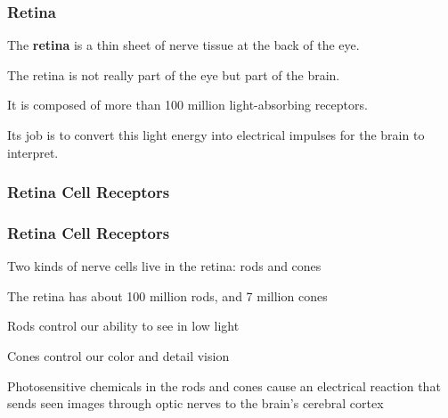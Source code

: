 \documentclass[12pt]{beamer}\usepackage[]{graphicx}\usepackage[]{color}
\begin{document}

\begin{frame}
\begin{center}
\end{center}
\end{frame}


\begin{frame}
\frametitle{Retina}

\bbi
  \item The \textbf{retina} is a thin sheet of nerve tissue at the back of the 
  eye.
  \item The retina is not really part of the eye but part of the brain.
  \item It is composed of more than 100 million light-absorbing receptors.
  \item Its job is to convert this light energy into electrical impulses
  for the brain to interpret.
\ei

\end{frame}


\begin{frame}
\frametitle{Retina Cell Receptors}
\begin{center}
\end{center}
\end{frame}


\begin{frame}
\frametitle{Retina Cell Receptors}

\bbi
  \item Two kinds of nerve cells live in the retina: rods and cones
  \item The retina has about 100 million rods, and 7 million cones
  \item Rods control our ability to see in low light
  \item Cones control our color and detail vision
  \item Photosensitive chemicals in the rods and cones cause an electrical
  reaction that sends seen images through optic nerves to the brain's cerebral
  cortex
\ei

\end{frame}
\end{document}
